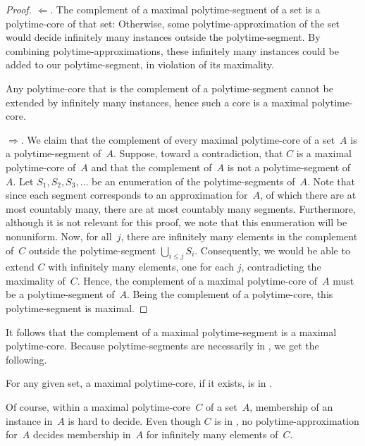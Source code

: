 \begin{proof}
  $\Longleftarrow$.
  The complement of a maximal polytime-segment of a set is a polytime-core of that set:
  Otherwise, some polytime-approximation of the set would decide infinitely many instances outside the polytime-segment.
  By combining polytime-approximations, these infinitely many instances could be added to our polytime-segment, in violation of its maximality.

  Any polytime-core that is the complement of a polytime-segment cannot be extended by infinitely many instances, hence such a core is a maximal polytime-core.

  $\Longrightarrow$.
  We claim that the complement of every maximal polytime-core of a set~$A$ is a polytime-segment of~$A$.
  Suppose, toward a contradiction, that $C$ is a maximal polytime-core of~$A$ and that the complement of~$A$ is not a polytime-segment of~$A$.
  Let $S_1, S_2, S_3, \ldots$ be an enumeration of the polytime-segments of~$A$.
  Note that since each segment corresponds to an approximation for~$A$, of which there are at most countably many, there are at most countably many segments.
  Furthermore, although it is not relevant for this proof, we note that this enumeration will be nonuniform.
  Now, for all~$j$, there are infinitely many elements in the complement of~$C$ outside the polytime-segment $\bigcup_{i \le j} S_i$.
  Consequently, we would be able to extend $C$ with infinitely many elements, one for each $j$, contradicting the maximality of~$C$.
  Hence, the complement of a maximal polytime-core of~$A$ must be a polytime-segment of~$A$.
  Being the complement of a polytime-core, this polytime-segment is maximal.
\end{proof}

It follows that the complement of a maximal polytime-segment is a maximal polytime-core.
Because polytime-segments are necessarily in , we get the following.
\begin{corollary}
  For any given set, a maximal polytime-core, if it exists, is in .
\end{corollary}

Of course, within a maximal polytime-core~$C$ of a set~$A$, membership of an instance in~$A$ is hard to decide.
Even though $C$ is in , no polytime-approximation for~$A$ decides membership in~$A$ for infinitely many elements of~$C$.

